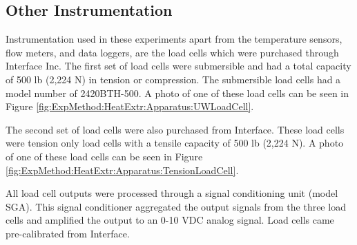 	\subsection{Other Instrumentation}
	\label{subsec:ExpMethod:Instr:Other}

Instrumentation used in these experiments apart from the temperature sensors, flow meters, and data loggers, are the load cells which were purchased through Interface Inc. The first set of load cells were submersible and had a total capacity of 500 lb (2,224 N) in tension or compression. The submersible load cells had a model number of 2420BTH-500. A photo of one of these load cells can be seen in Figure \ref{fig:ExpMethod:HeatExtr:Apparatus:UWLoadCell}.

The second set of load cells were also purchased from Interface. These load cells were tension only load cells with a tensile capacity of 500 lb (2,224 N). A photo of one of these load cells can be seen in Figure \ref{fig:ExpMethod:HeatExtr:Apparatus:TensionLoadCell}.

All load cell outputs were processed through a signal conditioning unit (model SGA). This signal conditioner aggregated the output signals from the three load cells and amplified the output to an 0-10 VDC analog signal. Load cells came pre-calibrated from Interface.
